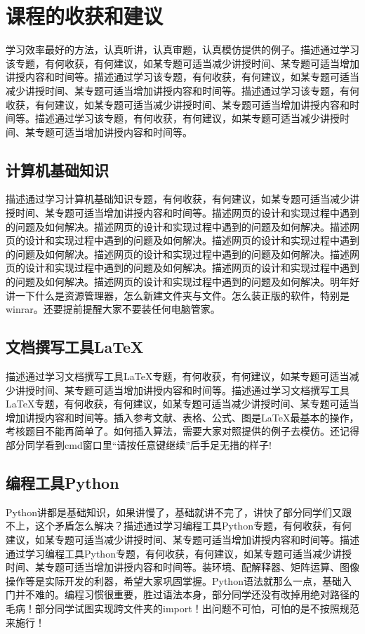 \documentclass[supercite]{Experimental_Report}
\theoremstyle{definition}
\begin{document}
\newpage

\section{课程的收获和建议}

学习效率最好的方法，认真听讲，认真审题，认真模仿提供的例子。描述通过学习该专题，有何收获，有何建议，如某专题可适当减少讲授时间、某专题可适当增加讲授内容和时间等。描述通过学习该专题，有何收获，有何建议，如某专题可适当减少讲授时间、某专题可适当增加讲授内容和时间等。描述通过学习该专题，有何收获，有何建议，如某专题可适当减少讲授时间、某专题可适当增加讲授内容和时间等。描述通过学习该专题，有何收获，有何建议，如某专题可适当减少讲授时间、某专题可适当增加讲授内容和时间等。

\subsection{计算机基础知识}

描述通过学习计算机基础知识专题，有何收获，有何建议，如某专题可适当减少讲授时间、某专题可适当增加讲授内容和时间等。描述网页的设计和实现过程中遇到的问题及如何解决。描述网页的设计和实现过程中遇到的问题及如何解决。描述网页的设计和实现过程中遇到的问题及如何解决。描述网页的设计和实现过程中遇到的问题及如何解决。描述网页的设计和实现过程中遇到的问题及如何解决。描述网页的设计和实现过程中遇到的问题及如何解决。描述网页的设计和实现过程中遇到的问题及如何解决。描述网页的设计和实现过程中遇到的问题及如何解决。明年好讲一下什么是资源管理器，怎么新建文件夹与文件。怎么装正版的软件，特别是winrar。还要提前提醒大家不要装任何电脑管家。

\subsection{文档撰写工具LaTeX}

描述通过学习文档撰写工具LaTeX专题，有何收获，有何建议，如某专题可适当减少讲授时间、某专题可适当增加讲授内容和时间等。描述通过学习文档撰写工具LaTeX专题，有何收获，有何建议，如某专题可适当减少讲授时间、某专题可适当增加讲授内容和时间等。插入参考文献、表格、公式、图是LaTeX最基本的操作，考核题目不能再简单了。如何插入算法，需要大家对照提供的例子去模仿。还记得部分同学看到cmd窗口里``请按任意键继续''后手足无措的样子!

\subsection{编程工具Python}

Python讲都是基础知识，如果讲慢了，基础就讲不完了，讲快了部分同学们又跟不上，这个矛盾怎么解决？描述通过学习编程工具Python专题，有何收获，有何建议，如某专题可适当减少讲授时间、某专题可适当增加讲授内容和时间等。描述通过学习编程工具Python专题，有何收获，有何建议，如某专题可适当减少讲授时间、某专题可适当增加讲授内容和时间等。装环境、配解释器、矩阵运算、图像操作等是实际开发的利器，希望大家巩固掌握。Python语法就那么一点，基础入门并不难的。编程习惯很重要，胜过语法本身，部分同学还没有改掉用绝对路径的毛病！部分同学试图实现跨文件夹的import！出问题不可怕，可怕的是不按照规范来施行！
\end{document}
